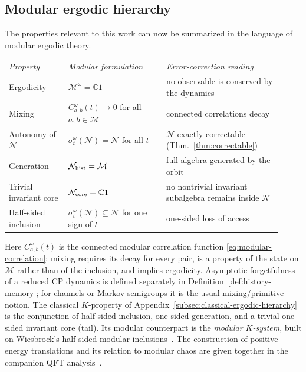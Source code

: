 \documentclass[a4paper,11pt]{article}
\theoremstyle{definition}
\newcommand{\mN}{\mathcal{N}}
\newcommand{\mM}{\mathcal{M}}
\begin{document}
\subsection{Modular ergodic hierarchy}\label{subsec:QEC-hierarchy}

The properties relevant to this work can now be summarized in the language of modular ergodic theory.
\begin{center}
\begin{tabular}{@{}>{\raggedright\arraybackslash}p{0.20\linewidth}>{\raggedright\arraybackslash}p{0.33\linewidth}>{\raggedright\arraybackslash}p{0.39\linewidth}@{}}
 \textit{Property} & \textit{Modular formulation} & \textit{Error-correction reading}\\[4pt]
 Ergodicity & $\mM^\omega=\mathbb C1$ & no observable is conserved by the dynamics\\
 Mixing & $C_{a,b}^\omega(t)\to0$ for all $a,b\in\mM$ & connected correlations decay\\
 Autonomy of $\mN$ & $\sigma^\omega_t(\mN)=\mN$ for all $t$ & $\mN$ exactly correctable (Thm.~\ref{thm:correctable})\\
 Generation & $\mN_{\rm hist}=\mM$ & full algebra generated by the orbit\\
 Trivial invariant core & $\mN_{\rm core}=\mathbb C1$ & no nontrivial invariant subalgebra remains inside $\mN$\\
 Half-sided inclusion & $\sigma^\omega_t(\mN)\subseteq\mN$ for one sign of $t$ & one-sided loss of access
\end{tabular}
\end{center}
Here $C^\omega_{a,b}(t)$ is the connected modular correlation function \eqref{eq:modular-correlation}; mixing requires its decay for every pair, is a property of the state on $\mM$ rather than of the inclusion, and implies ergodicity. Asymptotic forgetfulness of a reduced CP dynamics is defined separately in Definition~\ref{def:history-memory}; for channels or Markov semigroups it is the usual mixing/primitive notion. The classical $K$-property of Appendix~\ref{subsec:classical-ergodic-hierarchy} is the conjunction of half-sided inclusion, one-sided generation, and a trivial one-sided invariant core (tail). Its modular counterpart is the \emph{modular $K$-system}, built on
Wiesbrock's half-sided modular inclusions~\cite{Wiesbrock1993}.
The construction of positive-energy translations and its relation to
modular chaos are given together in the companion QFT analysis~\cite{companionQFT}.
\end{document}
